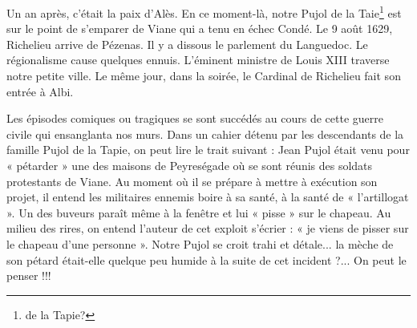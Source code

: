 Un an après, c'était la paix d'Alès. En ce moment-là, notre Pujol
de la Taie\footnote{de la Tapie?} est sur le point de s'emparer de Viane qui a tenu en
échec Condé. Le 9 août 1629, Richelieu arrive de Pézenas. Il y a
dissous le parlement du Languedoc. Le régionalisme cause quelques
ennuis. L'éminent ministre de Louis XIII traverse notre petite
ville. Le même jour, dans la soirée, le Cardinal de Richelieu
fait son entrée à Albi.

Les épisodes comiques ou tragiques se sont succédés au cours de
cette guerre civile qui ensanglanta nos murs. Dans un cahier
détenu par les descendants de la famille Pujol de la Tapie, on
peut lire le trait suivant : Jean Pujol était venu pour
« pétarder » une des maisons de Peyreségade où se sont réunis
des soldats protestants de Viane. Au moment où il se prépare à
mettre à exécution son projet, il entend les militaires ennemis
boire à sa santé, à la santé de « l'artillogat ». Un des buveurs
paraît même à la fenêtre et lui « pisse » sur le chapeau. Au
milieu des rires, on entend l'auteur de cet exploit s'écrier :
« je viens de pisser sur le chapeau d'une personne ». Notre
Pujol se croit trahi et détale... la mèche de son pétard
était-elle quelque peu humide à la suite de cet incident ?...
On peut le penser !!!